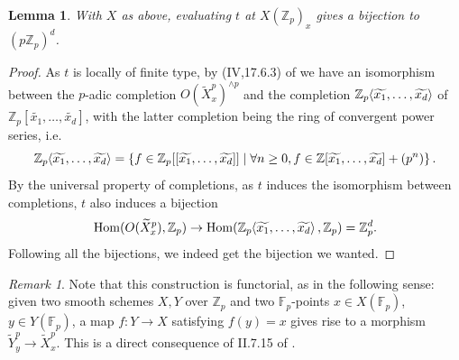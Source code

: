 \documentclass[12pt]{article}
\newcommand{\Z}{\mathbb{Z}}
\newcommand{\F}{\mathbb{F}}
\renewcommand{\angle}[1]{\hspace{-2pt}\left\langle #1 \right\rangle}
\DeclareMathOperator{\Hom}{Hom}
\theoremstyle{plain}
\newtheorem{lem}[thm]{Lemma} %
\theoremstyle{definition}
\theoremstyle{remark}
\newtheorem{rem}[thm]{Remark} %
\begin{document}
\begin{lem}
With $X$ as above, evaluating $t$ at $X(\Z_p)_x$ gives a bijection to $(p\Z_p)^d$.
\end{lem}
\begin{proof}
As $t$ is locally of finite type, by (IV,17.6.3) of \cite{ega} we have an isomorphism between the $p$-adic completion $O(\widetilde{X}_x^p)^{\wedge p}$ and the completion $\Z_p\angle{\widetilde{x_1},\dots, \widetilde{x_d}}$ of $\Z_p[\widetilde{x_1},\dots,\widetilde{x_d}]$, with the latter completion being the ring of convergent power series, i.e.
\[
\Z_p\angle{\widetilde{x_1},\dots, \widetilde{x_d}} = \left\{f \in \Z_p[[\widetilde{x_1},\dots,\widetilde{x_d}]] \mid \forall n \geq 0, f \in \Z[\widetilde{x_1},\dots,\widetilde{x_d}] + (p^n) \right\}.
\]
By the universal property of completions, as $t$ induces the isomorphism between completions, $t$ also induces a bijection $$\Hom(O(\widetilde{X}_x^p), \Z_p) \to \Hom(\Z_p\angle{\widetilde{x_1},\dots,\widetilde{x_d}},\Z_p) = \Z_p^d.$$ Following all the bijections, we indeed get the bijection we wanted.
\end{proof}

\begin{rem}
\label{rem:smoothpointsfunc}
Note that this construction is functorial, as in the following sense: given two smooth schemes $X,Y$ over $\Z_p$ and two $\F_p$-points $x\in X(\F_p)$, $y\in Y(\F_p)$, a map $f: Y \to X$ satisfying $f(y) = x$ gives rise to a morphism $\widetilde{Y}_y^p \to \widetilde{X}_x^p$. This is a direct consequence of II.7.15 of \cite{hartshorne}.
\end{rem}
\end{document}
